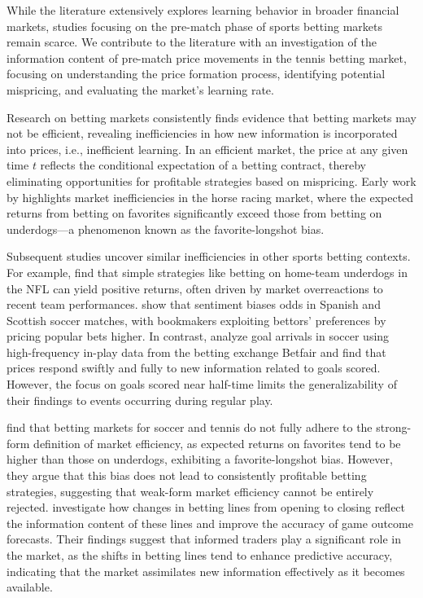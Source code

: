 \documentclass[webpdf,modern,medium]{oup-authoring-template}
\theoremstyle{thmstyleone}%
\theoremstyle{thmstyletwo}%
\theoremstyle{thmstylethree}%
\begin{document}
While the literature extensively explores learning behavior in broader financial markets, studies focusing on the pre-match phase of sports betting markets remain scarce. We contribute to the literature with an investigation of the information content of pre-match price movements in the tennis betting market, focusing on understanding the price formation process, identifying potential mispricing, and evaluating the market’s learning rate.

Research on betting markets consistently finds evidence that betting markets may not be efficient, revealing inefficiencies in how new information is incorporated into prices, i.e., inefficient learning. In an efficient market, the price at any given time $t$ reflects the conditional expectation of a betting contract, thereby eliminating opportunities for profitable strategies based on mispricing. Early work by \citet{thaler1988} highlights market inefficiencies in the horse racing market, where the expected returns from betting on favorites significantly exceed those from betting on underdogs---a phenomenon known as the favorite-longshot bias.

Subsequent studies uncover similar inefficiencies in other sports betting contexts. For example, \citet{gray1997} find that simple strategies like betting on home-team underdogs in the NFL can yield positive returns, often driven by market overreactions to recent team performances. \citet{forrest2008} show that sentiment biases odds in Spanish and Scottish soccer matches, with bookmakers exploiting bettors’ preferences by pricing popular bets higher.
In contrast, \citet{croxson2014} analyze goal arrivals in soccer using high-frequency in-play data from the betting exchange Betfair and find that prices respond swiftly and fully to new information related to goals scored. However, the focus on goals scored near half-time limits the generalizability of their findings to events occurring during regular play.

\citet{hegarty2024} find that betting markets for soccer and tennis do not fully adhere to the strong-form definition of market efficiency, as expected returns on favorites tend to be higher than those on underdogs, exhibiting a favorite-longshot bias. However, they argue that this bias does not lead to consistently profitable betting strategies, suggesting that weak-form market efficiency cannot be entirely rejected. \citet{gandar1998} investigate how changes in betting lines from opening to closing reflect the information content of these lines and improve the accuracy of game outcome forecasts. Their findings suggest that informed traders play a significant role in the market, as the shifts in betting lines tend to enhance predictive accuracy, indicating that the market assimilates new information effectively as it becomes available.
\end{document}
